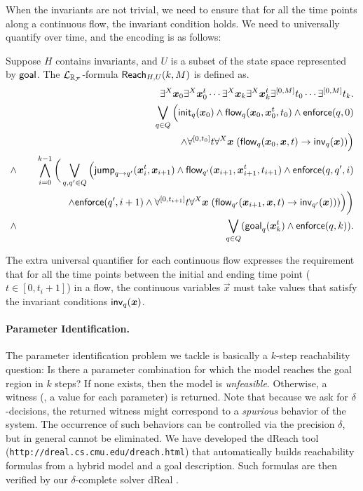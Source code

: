 When the invariants are not trivial, we need to ensure that for all the time points along a continuous flow, the invariant condition holds. We need to universally quantify over time, and the encoding is as follows:
\begin{definition}\label{br2}
Suppose $H$ contains invariants, and $U$ is a subset of the state space represented by $\mathsf{goal}$. The $\mathcal{L}_{\mathbb{R}_{\mathcal{F}}}$-formula $\mathsf{Reach}_{H,U}(k,M)$ is defined as.
\begin{eqnarray*}
& &\exists^X \vec x_{0} \exists^X\vec x_{0}^t\cdots \exists^X \vec x_{k}\exists^X\vec x_{k}^t \exists^{[0,M]}t_0\cdots \exists^{[0,M]}t_k.\\
& &\bigvee_{q\in Q} \Big(\init_{q}(\vec x_{0})\wedge \flow_{q}(\vec x_{0}, \vec x_{0}^t, t_0)\wedge \enforce(q,0)\\
& &\hspace{5cm} \wedge \forall^{[0,t_0]}t\forall^X\vec x\;(\flow_{q}(\vec x_{0}, \vec x, t)\rightarrow \inv_{q}(\vec x))\Big) \\
\wedge & &\bigwedge_{i=0}^{k-1}\bigg( \bigvee_{q, q'\in Q} \Big(\jump_{q\rightarrow q'}(\vec
x_{i}^t, \vec x_{i+1})\wedge \flow_{q'}(\vec x_{i+1}, \vec x_{i+1}^t, t_{i+1})\wedge \enforce(q,q',i)\\
& & \hspace{1.5cm}\wedge\enforce(q',i+1)\wedge \forall^{[0,t_{i+1}]}t\forall^X\vec x\;(\flow_{q'}(\vec x_{i+1}, \vec x,
t)\rightarrow \inv_{q'}(\vec x)) )\Big)\bigg)\\
\wedge & &\bigvee_{q\in Q} (\goal_q(\vec x_{k}^t)\wedge \enforce(q,k)).
\end{eqnarray*}
\end{definition}
The extra universal quantifier for each continuous flow expresses the requirement that for all the time points between the initial and ending time point ($t\in[0,t_i+1]$) in a flow, the continuous variables $\vec x$ must take values that satisfy the invariant conditions $\inv_q(\vec x)$.

\paragraph{Parameter Identification.}
The parameter identification problem we tackle is basically a $k$-step reachability question: Is there a parameter
combination for which the model reaches the goal region in $k$ steps? If none exists, then the model is 
{\em unfeasible}. Otherwise, a witness (\ie, a value for each parameter) is returned. Note that because we ask for
$\delta$-decisions, the returned witness might correspond to a {\em spurious} behavior of the system. The occurrence
of such behaviors can be controlled via the precision $\delta$, but in general cannot be eliminated. 
We have developed the dReach tool (\verb#http://dreal.cs.cmu.edu/dreach.html#) 
that automatically builds reachability formulas from a hybrid model and a goal 
description. Such formulas are then verified by our $\delta$-complete solver dReal \citep{dreal}.




